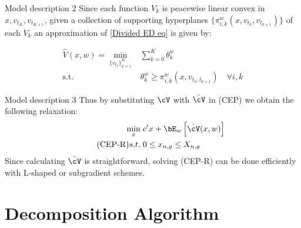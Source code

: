 \documentclass[11pt, aspectratio=169]{beamer}
\begin{document}
\begin{frame}{Model description 2}
Since each function \(V_k\) is peacewise linear convex in \(x,v_{t_K},v_{t_{K+1}}\), given a collection of supporting hyperplanes \(\{\pi^w_{i,k}(x,v_{t_k},v_{t_{k+1}})\}\) of each \(V_k\) an approximation of \eqref{Divided ED eq} is given by:

\begin{align}
  \hat{V}(x,w) = \min_{\{v_{t_k}\}_{k=1}^K} & \sum_{k=0}^K \theta_{k}^w \\
                \text{s.t.} \quad & \theta_k^w \geq \pi_{i,k}^w(x,v_{t_k,t_{k+1}}) \quad \forall i,k
\end{align}

\end{frame}
\begin{frame}{Model description 3}
Thus by substituting \(\cV\) with \( \hat{\cV} \) in (CEP) we obtain the following relaxation:
\begin{align*}
  \label{CEP-R}
  \min_{x} \;&c'x + \bE_w\left[\hat{\cV}(x,w)\right] \\  \tag{CEP-R}
  s.t. \; & 0 \leq x_{n,g} \leq X_{n,g} 
\end{align*}
  Since calculating \( \hat{\cV} \) is straightforward, solving (CEP-R) can be done efficiently with L-shaped or subgradient schemes.
\end{frame}  

\section{Decomposition Algorithm}
\end{document}
